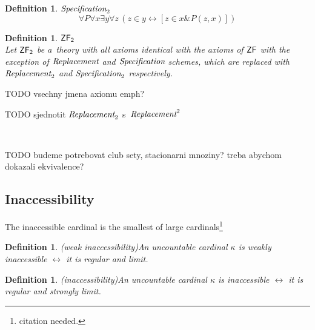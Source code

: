 \documentclass[12pt,a4paper]{article}
\newtheorem{definition}[theorem]{Definition}
\renewcommand{\iff}{\leftrightarrow}
\begin{document}
\begin{definition}{$\emph{Specification}_2$}\\
\begin{equation}
\forall P \forall x \exists y \forall z \, ( z \in y \iff [ z \in x \& P(z, x) ] )
\end{equation}
\end{definition}

\begin{definition}{$\sf{ZF}_2$}\\
Let $\sf{ZF}_2$ be a~theory with all axioms identical with the axioms of $\sf{ZF}$ with the exception of $\emph{Replacement}$ and $\emph{Specification}$ schemes, which are replaced with $\emph{Replacement}_2$ and $\emph{Specification}_2$ respectively.
\end{definition}

TODO vsechny jmena axiomu emph?

TODO sjednotit $\emph{Replacement}_2$ s~$\emph{Replacement}^2$

\

TODO budeme potrebovat club sety, stacionarni mnoziny? treba abychom dokazali ekvivalence?


\subsection{Inaccessibility}\label{section:inaccessibility}
The inaccessible cardinal is the smallest of large cardinals\footnote{citation needed.}

\begin{definition}(weak inaccessibility)\label{def:weakly_inaccessible}
An uncountable cardinal $\kappa$ is \emph{weakly inaccessible} $\iff$ it is \emph{regular} and \emph{limit}.
\end{definition}
\begin{definition}(inaccessibility)\label{def:inaccessible}
An uncountable cardinal $\kappa$ is \emph{inaccessible} $\iff$ it is \emph{regular} and \emph{strongly limit}.
\end{definition}
\end{document}
